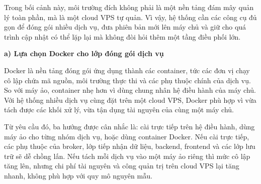 \documentclass[a4paper]{extarticle}
\begin{document}
Trong bối cảnh này, môi trường đích không phải là một nền tảng đám mây quản lý
toàn phần, mà là một cloud VPS tự quản. Vì vậy, hệ thống cần các công cụ đủ gọn
để đóng gói nhiều dịch vụ, đưa phiên bản mới lên máy chủ và giữ cho quá trình
cập nhật có thể lặp lại mà không đòi hỏi thêm một tầng điều phối lớn.

\textbf{a) Lựa chọn Docker cho lớp đóng gói dịch vụ}

Docker là nền tảng đóng gói ứng dụng thành các container, tức các đơn vị chạy cô
lập chứa mã nguồn, môi trường thực thi và các phụ thuộc chính của dịch vụ. So
với máy ảo, container nhẹ hơn vì dùng chung nhân hệ điều hành của máy chủ. Với
hệ thống nhiều dịch vụ cùng đặt trên một cloud VPS, Docker phù hợp vì vừa tách
được các khối xử lý, vừa tận dụng tài nguyên của cùng một máy chủ.

Từ yêu cầu đó, ba hướng được cân nhắc là: cài trực tiếp trên hệ điều hành, dùng
máy ảo cho từng nhóm dịch vụ, hoặc dùng container Docker. Nếu cài trực tiếp,
các phụ thuộc của broker, lớp tiếp nhận dữ liệu, backend, frontend và các lớp
lưu trữ sẽ dễ chồng lấn. Nếu tách mỗi dịch vụ vào một máy ảo riêng thì mức cô
lập tăng lên, nhưng chi phí tài nguyên và công quản trị trên cloud VPS lại tăng
nhanh, không phù hợp với quy mô nguyên mẫu.
\end{document}
